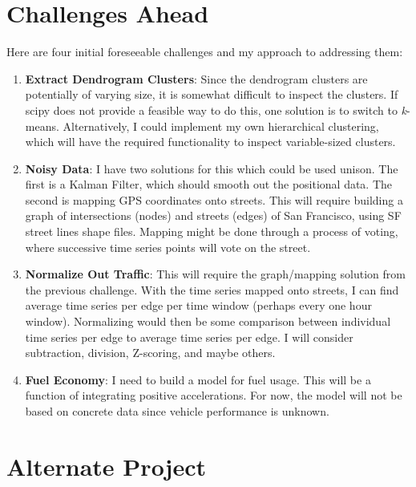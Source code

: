 \documentclass[12pt]{article}
\begin{document}
\section{Challenges Ahead}

Here are four initial foreseeable challenges and my approach to addressing them:

\begin{enumerate}
\item \textbf{Extract Dendrogram Clusters}: Since the dendrogram clusters are potentially of varying size, it is somewhat difficult to inspect the clusters. If scipy does not provide a feasible way to do this, one solution is to switch to \textit{k}-means. Alternatively, I could implement my own hierarchical clustering, which will have the required functionality to inspect variable-sized clusters.
\item \textbf{Noisy Data}: I have two solutions for this which could be used unison. The first is a Kalman Filter, which should smooth out the positional data. The second is mapping GPS coordinates onto streets. This will require building a graph of intersections (nodes) and streets (edges) of San Francisco, using SF street lines shape files. Mapping might be done through a process of voting, where successive time series points will vote on the street.
\item \textbf{Normalize Out Traffic}: This will require the graph/mapping solution from the previous challenge. With the time series mapped onto streets, I can find average time series per edge per time window (perhaps every one hour window). Normalizing would then be some comparison between individual time series per edge to average time series per edge. I will consider subtraction, division, Z-scoring, and maybe others.
\item \textbf{Fuel Economy}: I need to build a model for fuel usage. This will be a function of integrating positive accelerations. For now, the model will not be based on concrete data since vehicle performance is unknown.
\end{enumerate}




\section{Alternate Project}
\end{document}
